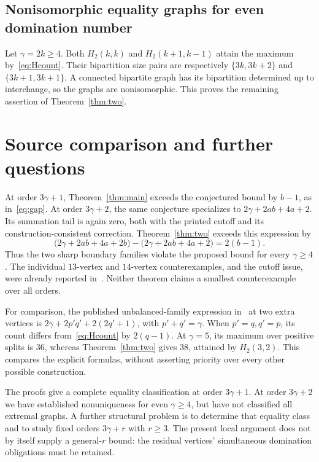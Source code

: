 \documentclass[11pt]{article}
\theoremstyle{definition}
\theoremstyle{remark}
\begin{document}
\subsection{Nonisomorphic equality graphs for even domination number}

Let $\gamma=2k\ge4$. Both $H_2(k,k)$ and $H_2(k+1,k-1)$ attain the
maximum by~\eqref{eq:Hcount}. Their bipartition size pairs are respectively
$\{3k,3k+2\}$ and $\{3k+1,3k+1\}$. A connected bipartite graph has its
bipartition determined up to interchange, so the graphs are nonisomorphic.
This proves the remaining assertion of Theorem~\ref{thm:two}.

\section{Source comparison and further questions}

At order $3\gamma+1$, Theorem~\ref{thm:main} exceeds the conjectured bound
by $b-1$, as in~\eqref{eq:gap}. At order $3\gamma+2$, the same conjecture
specializes to $2\gamma+2ab+4a+2$. Its summation tail is again zero, both
with the printed cutoff and its construction-consistent correction.
Theorem~\ref{thm:two} exceeds this expression by
\[
 \bigl(2\gamma+2ab+4a+2b\bigr)
       -\bigl(2\gamma+2ab+4a+2\bigr)=2(b-1).
\]
Thus the two sharp boundary families violate the proposed bound for every
$\gamma\ge4$. The individual $13$-vertex and $14$-vertex counterexamples,
and the cutoff issue, were already reported in~\cite{E}. Neither theorem
claims a smallest counterexample over all orders.

For comparison, the published unbalanced-family expression in~\cite{E}
at two extra vertices is $2\gamma+2p'q'+2(2q'+1)$, with $p'+q'=\gamma$.
When $p'=q,q'=p$, its count differs from~\eqref{eq:Hcount} by $2(q-1)$.
At $\gamma=5$, its maximum over positive splits is $36$, whereas
Theorem~\ref{thm:two} gives $38$, attained by $H_2(3,2)$. This compares
the explicit formulas, without asserting priority over every other
possible construction.

The proofs give a complete equality classification at order $3\gamma+1$.
At order $3\gamma+2$ we have established nonuniqueness for even
$\gamma\ge4$, but have not classified all extremal graphs. A further
structural problem is to determine that equality class and to study fixed
orders $3\gamma+r$ with $r\ge3$. The present local argument does not by
itself supply a general-$r$ bound: the residual vertices' simultaneous
domination obligations must be retained.
\end{document}
